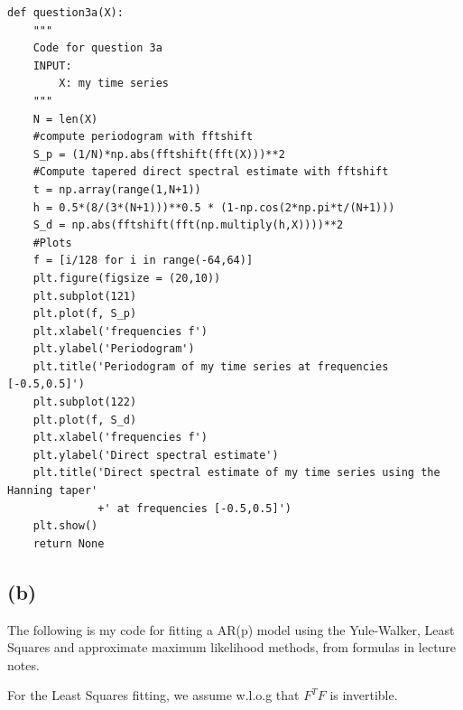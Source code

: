 \documentclass[a4paper,10pt]{article}
\theoremstyle{mytheor}
\begin{document}
\begin{lstlisting}
def question3a(X):
    """
    Code for question 3a 
    INPUT:
        X: my time series
    """
    N = len(X)
    #compute periodogram with fftshift
    S_p = (1/N)*np.abs(fftshift(fft(X)))**2
    #Compute tapered direct spectral estimate with fftshift
    t = np.array(range(1,N+1))
    h = 0.5*(8/(3*(N+1)))**0.5 * (1-np.cos(2*np.pi*t/(N+1)))
    S_d = np.abs(fftshift(fft(np.multiply(h,X))))**2
    #Plots
    f = [i/128 for i in range(-64,64)]
    plt.figure(figsize = (20,10))
    plt.subplot(121)
    plt.plot(f, S_p)
    plt.xlabel('frequencies f')
    plt.ylabel('Periodogram')
    plt.title('Periodogram of my time series at frequencies [-0.5,0.5]')
    plt.subplot(122)
    plt.plot(f, S_d)
    plt.xlabel('frequencies f')
    plt.ylabel('Direct spectral estimate')
    plt.title('Direct spectral estimate of my time series using the Hanning taper'
              +' at frequencies [-0.5,0.5]')
    plt.show() 
    return None       
\end{lstlisting}
\subsection*{(b)}

The following is my code for fitting a AR(p) model using the Yule-Walker, Least Squares and approximate maximum likelihood methods, from formulas in lecture notes.

For the Least Squares fitting, we assume w.l.o.g that $F^TF$ is invertible. 
\end{document}
